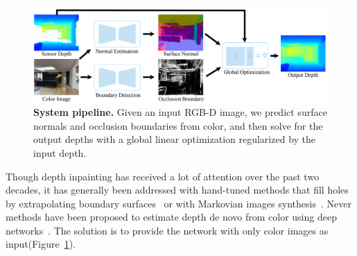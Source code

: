 \documentclass[10pt,twocolumn,letterpaper]{article}
\begin{document}
\begin{figure}
\begin{center}
   \includegraphics[width=1\linewidth]{Systempipeline.png}
\end{center}
   \caption{\textbf{System pipeline.} Given an input RGB-D image, we predict surface normals and occlusion boundaries from color, and then solve for the output depths with a global linear optimization regularized by the input depth\cite{Zhang_2018_CVPR}.}
\label{fig:System}
\end{figure}

Though depth inpainting has received a lot of attention over the past two decades\cite{Uhrig2017Sparsity}, it has generally been addressed with hand-tuned methods that fill holes by extrapolating boundary surfaces~\cite{Matsuo2015Depth} or with Markovian images synthesis~\cite{Doria_2012_CVPRW}. Never methods have been proposed to estimate depth de novo from color using deep networks~\cite{Eigen2014Depth}. The solution is to provide the network with only color images as input(Figure~\ref{fig:System}).\par
\end{document}
